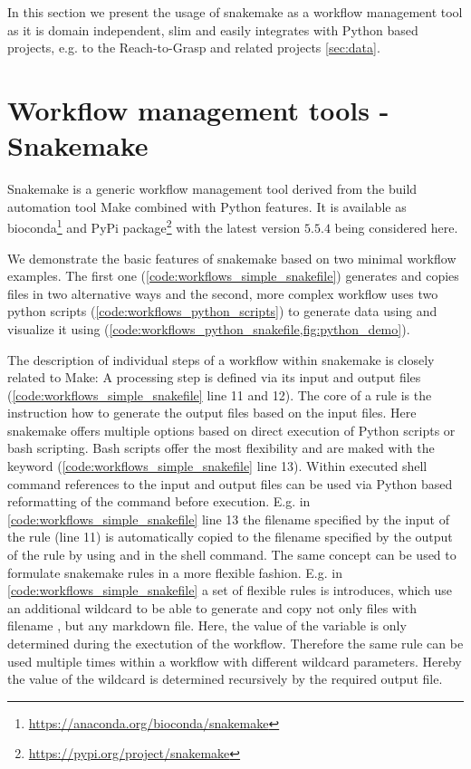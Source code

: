 

In this section we present the usage of snakemake as a workflow management tool as it is domain independent, slim and easily integrates with Python based projects, e.g. to the Reach-to-Grasp and related projects \cref{sec:data}.

\section{Workflow management tools - Snakemake}
\label{sec:snakemake}
Snakemake is a generic workflow management tool derived from the build automation tool Make combined with Python features. It is available as bioconda\footnote{\url{https://anaconda.org/bioconda/snakemake}} and PyPi package\footnote{\url{https://pypi.org/project/snakemake}} with the latest version $5.5.4$ being considered here.

We demonstrate the basic features of snakemake based on two minimal workflow examples. The first one (\cref{code:workflows_simple_snakefile}) generates and copies files in two alternative ways and the second, more complex workflow uses two python scripts (\cref{code:workflows_python_scripts}) to generate data using  and visualize it using  (\cref{code:workflows_python_snakefile,fig:python_demo}).

The description of individual steps of a workflow within snakemake is closely related to Make: A processing step is defined via its input and output files (\cref{code:workflows_simple_snakefile} line 11 and 12). The core of a rule is the instruction how to generate the output files based on the input files. Here snakemake offers multiple options based on direct execution of Python scripts or bash scripting. Bash scripts offer the most flexibility and are maked with the  keyword (\cref{code:workflows_simple_snakefile} line 13). Within executed shell command references to the input and output files can be used via Python based reformatting of the command before execution. E.g. in \cref{code:workflows_simple_snakefile} line 13 the filename specified by the input of the rule  (line 11) is automatically copied to the filename specified by the output of the rule by using  and  in the shell command. The same concept can be used to formulate snakemake rules in a more flexible fashion. E.g. in \cref{code:workflows_simple_snakefile} a set of flexible rules is introduces, which use an additional wildcard  to be able to generate and copy not only files with filename , but any markdown file. Here, the value of the variable  is only determined during the exectution of the workflow. Therefore the same rule can be used multiple times within a workflow with different wildcard parameters. Hereby the value of the wildcard is determined recursively by the required output file.

